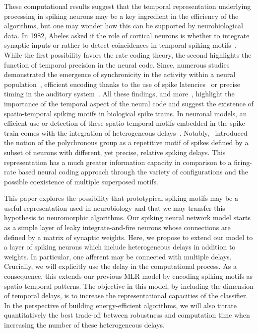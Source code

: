 \documentclass[default]{sn-jnl}%
\theoremstyle{thmstyleone}%
\theoremstyle{thmstyletwo}%
\theoremstyle{thmstylethree}%
\begin{document}
These computational results suggest that the temporal representation underlying processing in spiking neurons may be a key ingredient in the efficiency of the algorithms, but one may wonder how this can be supported by neurobiological data. In 1982, Abeles asked if the role of cortical neurons is whether to integrate synaptic inputs or rather to detect coincidences in temporal spiking motifs~\citep{abeles_role_1982}. While the first possibility favors the rate coding theory, the second highlights the function of temporal precision in the neural code. Since, numerous studies demonstrated the emergence of synchronicity in the activity within a neural population~\citep{riehle_spike_1997, davis_spontaneous_2021}, efficient encoding thanks to the use of spike latencies~\citep{perrinet_coding_2004, gollisch_rapid_2008} or precise timing in the auditory system~\citep{deweese_binary_2002, carr_circuit_1990}. All these findings, and more~\citep{bohte_evidence_2004}, highlight the importance of the temporal aspect of the neural code and suggest the existence of spatio-temporal spiking motifs in biological spike trains. In neuronal models, an efficient use or detection of these spatio-temporal motifs embedded in the spike train comes with the integration of heterogeneous delays~\citep{gutig_tempotron_2006, guise_bayesian_2014, zhang_supervised_2020}. Notably,~\citet{izhikevich_polychronization_2006} introduced the notion of the polychronous group as a repetitive motif of spikes defined by a subset of neurons with different, yet precise, relative spiking delays. This representation has a much greater information capacity in comparison to a firing-rate based neural coding approach through the variety of configurations and the possible coexistence of multiple superposed motifs.

This paper explores the possibility that prototypical spiking motifs may be a useful representation used in neurobiology and that we may transfer this hypothesis to neuromorphic algorithms. Our spiking neural network model starts as a simple layer of leaky integrate-and-fire neurons whose connections are defined by a matrix of synaptic weights. Here, we propose to extend our model to a layer of spiking neurons which include heterogeneous delays in addition to weights. In particular, one afferent may be connected with multiple delays. Crucially, we will explicitly use the delay in the computational process. As a consequence, this extends our previous MLR model by encoding spiking motifs as spatio-temporal patterns. The objective in this model, by including the dimension of temporal delays, is to increase the representational capacities of the classifier. In the perspective of building energy-efficient algorithms, we will also titrate quantitatively the best trade-off between robustness and computation time when increasing the number of these heterogeneous delays. %
%
\end{document}
